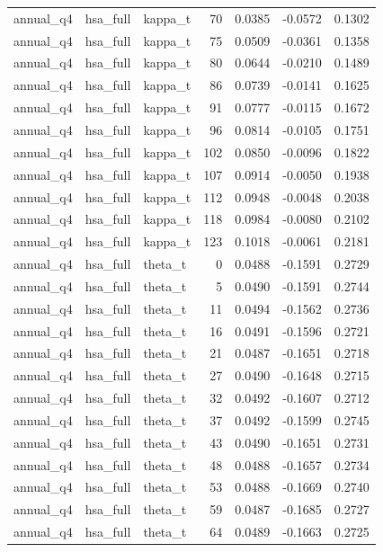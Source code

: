 \begin{tabular}{lllrrrr}
annual\_q4 & hsa\_full & kappa\_t & 70 & 0.0385 & -0.0572 & 0.1302 \\
annual\_q4 & hsa\_full & kappa\_t & 75 & 0.0509 & -0.0361 & 0.1358 \\
annual\_q4 & hsa\_full & kappa\_t & 80 & 0.0644 & -0.0210 & 0.1489 \\
annual\_q4 & hsa\_full & kappa\_t & 86 & 0.0739 & -0.0141 & 0.1625 \\
annual\_q4 & hsa\_full & kappa\_t & 91 & 0.0777 & -0.0115 & 0.1672 \\
annual\_q4 & hsa\_full & kappa\_t & 96 & 0.0814 & -0.0105 & 0.1751 \\
annual\_q4 & hsa\_full & kappa\_t & 102 & 0.0850 & -0.0096 & 0.1822 \\
annual\_q4 & hsa\_full & kappa\_t & 107 & 0.0914 & -0.0050 & 0.1938 \\
annual\_q4 & hsa\_full & kappa\_t & 112 & 0.0948 & -0.0048 & 0.2038 \\
annual\_q4 & hsa\_full & kappa\_t & 118 & 0.0984 & -0.0080 & 0.2102 \\
annual\_q4 & hsa\_full & kappa\_t & 123 & 0.1018 & -0.0061 & 0.2181 \\
annual\_q4 & hsa\_full & theta\_t & 0 & 0.0488 & -0.1591 & 0.2729 \\
annual\_q4 & hsa\_full & theta\_t & 5 & 0.0490 & -0.1591 & 0.2744 \\
annual\_q4 & hsa\_full & theta\_t & 11 & 0.0494 & -0.1562 & 0.2736 \\
annual\_q4 & hsa\_full & theta\_t & 16 & 0.0491 & -0.1596 & 0.2721 \\
annual\_q4 & hsa\_full & theta\_t & 21 & 0.0487 & -0.1651 & 0.2718 \\
annual\_q4 & hsa\_full & theta\_t & 27 & 0.0490 & -0.1648 & 0.2715 \\
annual\_q4 & hsa\_full & theta\_t & 32 & 0.0492 & -0.1607 & 0.2712 \\
annual\_q4 & hsa\_full & theta\_t & 37 & 0.0492 & -0.1599 & 0.2745 \\
annual\_q4 & hsa\_full & theta\_t & 43 & 0.0490 & -0.1651 & 0.2731 \\
annual\_q4 & hsa\_full & theta\_t & 48 & 0.0488 & -0.1657 & 0.2734 \\
annual\_q4 & hsa\_full & theta\_t & 53 & 0.0488 & -0.1669 & 0.2740 \\
annual\_q4 & hsa\_full & theta\_t & 59 & 0.0487 & -0.1685 & 0.2727 \\
annual\_q4 & hsa\_full & theta\_t & 64 & 0.0489 & -0.1663 & 0.2725 \\

\end{tabular}
